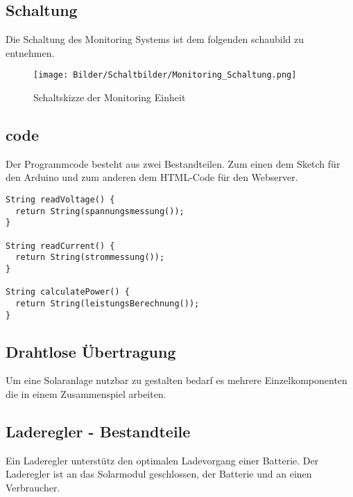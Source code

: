 \documentclass [ngerman]{mucproc}
\newenvironment{minted}[2][]{\endgraf\verbatim}{\endverbatim}
\begin{document}
		
		
\subsection{Schaltung}

Die Schaltung des Monitoring Systems ist dem folgenden schaubild zu entnehmen.

		\begin{figure}
			\centering
			\texttt{[image: Bilder/Schaltbilder/Monitoring\_Schaltung.png]}
			\caption{Schaltskizze der Monitoring Einheit}
			\label{fig:Monitoring Einheit}
		\end{figure}


\subsection{code}

Der Programmcode besteht aus zwei Bestandteilen. Zum einen dem Sketch für den Arduino und zum anderen dem HTML-Code für den Webserver.

\begin{verbatim}
String readVoltage() {
  return String(spannungsmessung());
}

String readCurrent() {
  return String(strommessung());
}

String calculatePower() {
  return String(leistungsBerechnung());
}
\end{verbatim}


\subsection{Drahtlose Übertragung}

Um eine Solaranlage nutzbar zu gestalten bedarf es mehrere Einzelkomponenten die in einem Zusammenspiel arbeiten.

\subsection{Laderegler - Bestandteile}

Ein Laderegler unterstütz den optimalen Ladevorgang einer Batterie. Der Laderegler ist an das Solarmodul geschlossen, der Batterie und an einen Verbraucher.
\end{document}
